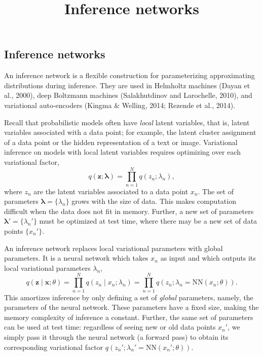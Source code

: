 \title{Inference networks}

\subsection{Inference networks}

An inference network is a flexible construction for parameterizing
approximating distributions during inference.
They are used in Helmholtz machines (Dayan et al., 2000), deep
Boltzmann machines (Salakhutdinov and Larochelle, 2010), and
variational auto-encoders (Kingma & Welling, 2014; Rezende et al.,
2014).

Recall that probabilistic models often have \emph{local} latent
variables, that is, latent variables associated with a data point; for
example, the latent cluster assignment of a data point or the hidden
representation of a text or image.
Variational
inference on models with local latent variables
requires optimizing over each variational factor,
\begin{equation*}
q(\mathbf{z}; \mathbf{\lambda}) = \prod_{n=1}^N q(z_n; \lambda_n),
\end{equation*}
where $z_n$ are the latent variables associated to a data point $x_n$.
The set of parameters $\mathbf{\lambda}=\{\lambda_n\}$ grows with the
size of data. This makes computation difficult when the data
does not fit in memory.
Further, a new set of parameters $\mathbf{\lambda}'=\{\lambda_n'\}$
must be optimized at test time, where there may be a new set of data
points $\{x_n'\}$.

An inference network replaces local variational parameters with global
parameters. It is a neural network
which takes $x_n$ as input and which outputs its local variational parameters
$\lambda_n$,
\begin{equation*}
q(\mathbf{z}\mid \mathbf{x}; \theta)
= \prod_{n=1}^N q(z_n \mid x_n; \lambda_n)
= \prod_{n=1}^N q(z_n; \lambda_n = \mathrm{NN}(x_n; \theta)).
\end{equation*}
This amortizes inference by only defining a set of \emph{global} parameters,
namely, the parameters of the neural network. These parameters have a
fixed size, making the memory complexity of inference a constant.
Further, the same set of parameters can be used at test time:
regardless of seeing new or old data points $x_n'$, we simply pass it
through the neural network (a forward pass) to obtain its
corresponding variational factor $q(z_n'; \lambda_n' =
\mathrm{NN}(x_n'; \theta))$.

